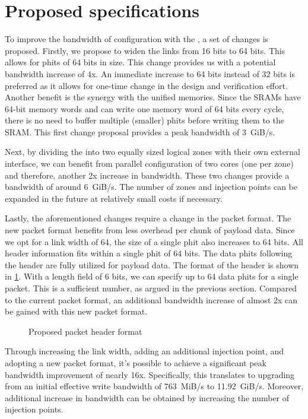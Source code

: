 \section{Proposed specifications}
\label{sec:proposed_noc}
To improve the bandwidth of configuration with the \confignoc{}, a set of changes is proposed. Firstly, we propose to widen the links from 16 bits to 64 bits.
This allows for phits of 64 bits in size.
This change provides us with a potential bandwidth increase of 4x.
An immediate increase to 64 bits instead of 32 bits is preferred as it allows for one-time change in the design and verification effort.
Another benefit is the synergy with the unified memories.
Since the SRAMs have 64-bit memory words and can write one memory word of 64 bits every cycle, there is no need to buffer multiple (smaller) phits before writing them to the SRAM.
This first change proposal provides a peak bandwidth of \SI{3}{GiB/s}.

Next, by dividing the \confignoc{} into two equally sized logical zones with their own external interface, we can benefit from parallel configuration of two cores (one per zone) and therefore, another 2x increase in bandwidth.
These two changes provide a bandwidth of around \SI{6}{GiB/s}. 
The number of zones and injection points can be expanded in the future at relatively small costs if necessary.

Lastly, the aforementioned changes require a change in the packet format.
The new packet format benefits from less overhead per chunk of payload data.
Since we opt for a link width of 64, the size of a single phit also increases to 64 bits.
All header information fits within a single phit of 64 bits.
The data phits following the header are fully utilized for payload data.
The format of the header is shown in \cref{fig:packet_format_header_new}.
With a length field of 6 bits, we can specify up to 64 data phits for a single packet.
This is a sufficient number, as argued in the previous section. 
Compared to the current packet format, an additional bandwidth increase of almost 2x can be gained with this new packet format.

\begin{figure}[hbtp]
    \centering
    \resizebox{\linewidth}{!}{
        
    }
    \caption{Proposed packet header format}
    \label{fig:packet_format_header_new}
\end{figure}

Through increasing the link width, adding an additional injection point, and adopting a new packet format, it's possible to achieve a significant peak bandwidth improvement of nearly 16x.
Specifically, this translates to upgrading from an initial effective write bandwidth of \SI{763}{MiB/s} to \SI{11.92}{GiB/s}.
Moreover, additional increase in bandwidth can be obtained by increasing the number of injection points.
